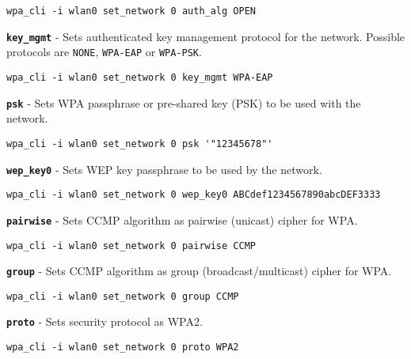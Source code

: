 	\begin{lstlisting}[style=framelesstext]
	wpa_cli -i wlan0 set_network 0 auth_alg OPEN
	\end{lstlisting}


\noindent
{} \texttt{\bfseries key\_mgmt} - Sets authenticated key management protocol for the network. Possible protocols are \texttt{NONE}, \texttt{WPA-EAP} or \texttt{WPA-PSK}.

	\begin{lstlisting}[style=framelesstext]
	wpa_cli -i wlan0 set_network 0 key_mgmt WPA-EAP
	\end{lstlisting}


\noindent
{} \texttt{\bfseries psk} - Sets WPA passphrase or pre-shared key (PSK) to be used with the network.

	\begin{lstlisting}[style=framelesstext]
	wpa_cli -i wlan0 set_network 0 psk '"12345678"'
	\end{lstlisting}


\noindent
{} \texttt{\bfseries wep\_key0} - Sets WEP key passphrase to be used by the network.

	\begin{lstlisting}[style=framelesstext]
	wpa_cli -i wlan0 set_network 0 wep_key0 ABCdef1234567890abcDEF3333
	\end{lstlisting}


\noindent
{} \texttt{\bfseries pairwise} - Sets CCMP algorithm as pairwise (unicast) cipher for WPA.

	\begin{lstlisting}[style=framelesstext]
	wpa_cli -i wlan0 set_network 0 pairwise CCMP
	\end{lstlisting}


\noindent
{} \texttt{\bfseries group} - Sets CCMP algorithm as group (broadcast/multicast) cipher for WPA.

	\begin{lstlisting}[style=framelesstext]
	wpa_cli -i wlan0 set_network 0 group CCMP
	\end{lstlisting}


\noindent
{} \texttt{\bfseries proto} - Sets security protocol as WPA2.

    \begin{lstlisting}[style=framelesstext]
   	wpa_cli -i wlan0 set_network 0 proto WPA2
    \end{lstlisting}


